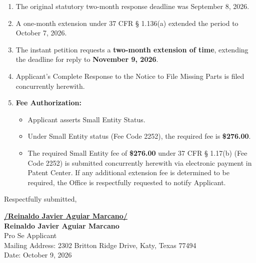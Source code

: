 \documentclass[11pt,letterpaper]{article}
\begin{document}
\begin{enumerate}[leftmargin=2em, itemsep=4pt]
    \item The original statutory two-month response deadline was September 8, 2026.
    \item A one-month extension under 37 CFR \S{} 1.136(a) extended the period to October 7, 2026.
    \item The instant petition requests a \textbf{two-month extension of time}, extending the deadline for reply to \textbf{November 9, 2026}.
    \item Applicant's Complete Response to the Notice to File Missing Parts is filed concurrently herewith.
    \item \textbf{Fee Authorization:} 
    \begin{itemize}
        \item Applicant asserts Small Entity Status.
        \item Under Small Entity status (Fee Code 2252), the required fee is \textbf{\$276.00}.
        \item The required Small Entity fee of \textbf{\$276.00} under 37 CFR \S{} 1.17(b) (Fee Code 2252) is submitted concurrently herewith via electronic payment in Patent Center. If any additional extension fee is determined to be required, the Office is respectfully requested to notify Applicant.
    \end{itemize}
\end{enumerate}

\vspace{1.0cm}
\begin{singlespace}
\noindent Respectfully submitted, \par\vspace{1.5cm}
\underline{\textbf{/Reinaldo Javier Aguiar Marcano/}} \\
\textbf{Reinaldo Javier Aguiar Marcano} \\
Pro Se Applicant \\
Mailing Address: 2302 Britton Ridge Drive, Katy, Texas 77494 \\
Date: October 9, 2026
\end{singlespace}
\end{document}
